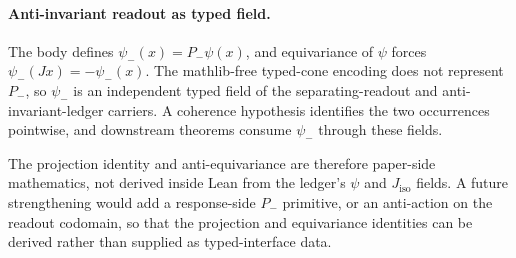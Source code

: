 \documentclass[11pt]{article}
\newcommand{\Pminus}{P_{-}}
\newcommand{\psim}{\psi_{-}}
\newcommand{\Jiso}{J_{\mathrm{iso}}}
\theoremstyle{definition}
\begin{document}
\paragraph{Anti-invariant readout as typed field.}
The body defines \(\psim(x)=\Pminus\psi(x)\), and equivariance of
\(\psi\) forces \(\psim(Jx)=-\psim(x)\).  The mathlib-free typed-cone
encoding does not represent \(\Pminus\), so \(\psim\) is an
independent typed field of the separating-readout and
anti-invariant-ledger carriers.  A coherence hypothesis identifies the
two occurrences pointwise, and downstream theorems consume \(\psim\)
through these fields.

The projection identity and anti-equivariance are therefore paper-side
mathematics, not derived inside Lean from the ledger's \(\psi\) and
\(\Jiso\) fields.  A future strengthening would add a response-side
\(\Pminus\) primitive, or an anti-action on the readout codomain, so
that the projection and equivariance identities can be derived rather
than supplied as typed-interface data.
\end{document}
